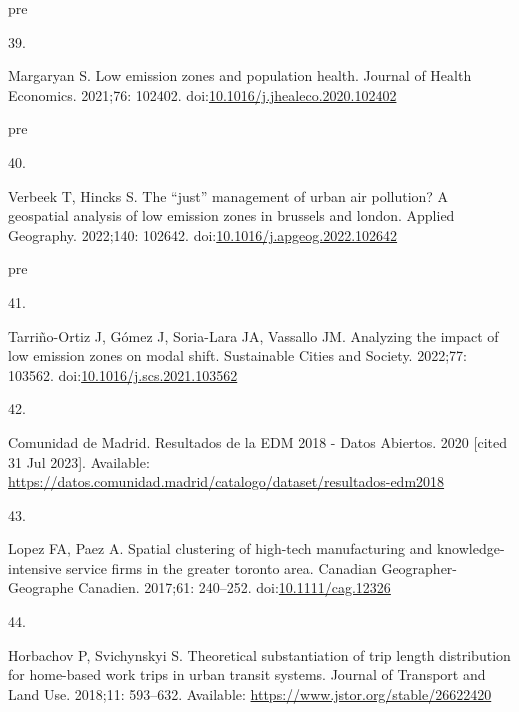 \documentclass[10pt,letterpaper]{article}
\newlength{\cslhangindent}
\newlength{\csllabelwidth}
\newlength{\cslentryspacingunit} %
\newenvironment{CSLReferences}[2] %
 {%
  \setlength{\parindent}{0pt}
  \ifodd #1
  \let\oldpar\par
  \def\par{\hangindent=\cslhangindent\oldpar}
  \fi
  \setlength{\parskip}{#2\cslentryspacingunit}
 }%
 {}
\newcommand{\CSLLeftMargin}[1]{\parbox[t]{\csllabelwidth}{#1}}
\newcommand{\CSLRightInline}[1]{\parbox[t]{\linewidth - \csllabelwidth}{#1}\break}
\providecommand{\DIFaddtex}[1]{{\protect\color{blue}\uwave{#1}}} %
\providecommand{\DIFaddbegin}{} %
\providecommand{\DIFaddend}{} %
\providecommand{\DIFdelbegin}{} %
\providecommand{\DIFdelend}{} %
\providecommand{\DIFadd}[1]{\texorpdfstring{\DIFaddtex{#1}}{#1}} %
\newcommand{\DIFscaledelfig}{0.5}
\newlength{\DIFdelgraphicswidth} %
\newlength{\DIFdelgraphicsheight} %
\newcommand{\DIFaddincludegraphics}[2][]{{\color{blue}\fbox{\DIFOincludegraphics[#1]{#2}}}} %
\newcommand{\DIFdelincludegraphics}[2][]{%
\sbox{\DIFdelgraphicsbox}{\DIFOincludegraphics[#1]{#2}}%
\settoboxwidth{\DIFdelgraphicswidth}{\DIFdelgraphicsbox} %
\settoboxtotalheight{\DIFdelgraphicsheight}{\DIFdelgraphicsbox} %
\scalebox{\DIFscaledelfig}{%
\parbox[b]{\DIFdelgraphicswidth}{\usebox{\DIFdelgraphicsbox}\\[-\baselineskip] \rule{\DIFdelgraphicswidth}{0em}}\llap{\resizebox{\DIFdelgraphicswidth}{\DIFdelgraphicsheight}{%
\setlength{\unitlength}{\DIFdelgraphicswidth}%
\begin{picture}(1,1)%
\thicklines\linethickness{2pt} %
{\color[rgb]{1,0,0}\put(0,0){\framebox(1,1){}}}%
{\color[rgb]{1,0,0}\put(0,0){\line( 1,1){1}}}%
{\color[rgb]{1,0,0}\put(0,1){\line(1,-1){1}}}%
\end{picture}%
}\hspace*{3pt}}} %
} %
\DeclareRobustCommand{\DIFaddbegin}{\DIFOaddbegin \let\includegraphics\DIFaddincludegraphics} %
\DeclareRobustCommand{\DIFaddend}{\DIFOaddend \let\includegraphics\DIFOincludegraphics} %
\DeclareRobustCommand{\DIFdelbegin}{\DIFOdelbegin \let\includegraphics\DIFdelincludegraphics} %
\DeclareRobustCommand{\DIFdelend}{\DIFOaddend \let\includegraphics\DIFOincludegraphics} %
\begin{document}
\begin{CSLReferences}{0}{0}
\leavevmode\vadjust \DIFadd{pre}{\hypertarget{ref-margaryanLowEmissionZones2021}{}}%
\CSLLeftMargin{39. }%
\CSLRightInline{Margaryan S. Low emission zones and population health.
Journal of Health Economics. 2021;76: 102402.
doi:\href{https://doi.org/10.1016/j.jhealeco.2020.102402}{10.1016/j.jhealeco.2020.102402}}

\leavevmode\vadjust \DIFadd{pre}{\hypertarget{ref-verbeekJustManagementUrban2022}{}}%
\CSLLeftMargin{40. }%
\CSLRightInline{Verbeek T, Hincks S. The {``just''} management of urban
air pollution? A geospatial analysis of low emission zones in brussels
and london. Applied Geography. 2022;140: 102642.
doi:\href{https://doi.org/10.1016/j.apgeog.2022.102642}{10.1016/j.apgeog.2022.102642}}

\leavevmode\vadjust \DIFadd{pre}{\hypertarget{ref-tarrinoortizAnalyzingImpactLow2022}{}}%
\CSLLeftMargin{41. }%
\DIFaddend \CSLRightInline{Tarriño-Ortiz J, Gómez J, Soria-Lara JA, Vassallo JM.
Analyzing the impact of low emission zones on modal shift. Sustainable
Cities and Society. 2022;77: 103562.
doi:\href{https://doi.org/10.1016/j.scs.2021.103562}{10.1016/j.scs.2021.103562}}

\leavevmode{}%
\DIFdelbegin %
\DIFdelend \DIFaddbegin \CSLLeftMargin{42. }\DIFaddend %
\CSLRightInline{Comunidad de Madrid. Resultados de la {EDM} 2018 - Datos
Abiertos. 2020 {[}cited 31 Jul 2023{]}. Available:
\url{https://datos.comunidad.madrid/catalogo/dataset/resultados-edm2018}}

\leavevmode{}%
\DIFdelbegin %
\DIFdelend \DIFaddbegin \CSLLeftMargin{43. }\DIFaddend %
\CSLRightInline{Lopez FA, Paez A. Spatial clustering of high-tech
manufacturing and knowledge-intensive service firms in the greater
toronto area. Canadian Geographer-Geographe Canadien. 2017;61: 240--252.
doi:\href{https://doi.org/10.1111/cag.12326}{10.1111/cag.12326}}

\leavevmode{}%
\DIFdelbegin %
\DIFdelend \DIFaddbegin \CSLLeftMargin{44. }\DIFaddend %
\CSLRightInline{Horbachov P, Svichynskyi S. Theoretical substantiation
of trip length distribution for home-based work trips in urban transit
systems. Journal of Transport and Land Use. 2018;11: 593--632.
Available: \url{https://www.jstor.org/stable/26622420}}


\end{CSLReferences}
\end{document}
